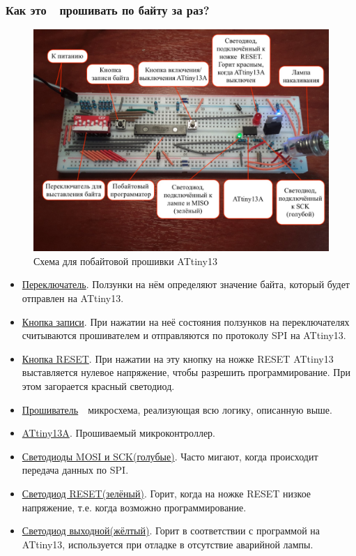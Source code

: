 \documentclass[aspectratio=169, pdf, 8pt, unicode]{beamer}
\begin{document}
\begin{frame}[fragile]
\frametitle{Как это\ \cyrdash\ прошивать по байту за раз?}
	\begin{minipage}{0.54\textwidth}
		\begin{figure}[H]
			\centering
			\includegraphics[width=\textwidth]{resources/schematic_new_rus.jpg}
			\caption{Схема для побайтовой прошивки ATtiny13}
		\end{figure}
	\end{minipage}
	\begin{minipage}{0.45\textwidth}
		\vspace*{-0.1cm}
		\begin{itemize}
		\small
			\item \underline{Переключатель}. Ползунки на нём определяют значение байта, который будет отправлен на ATtiny13.
			\item \underline{Кнопка записи}. При нажатии на неё состояния ползунков на переключателях считываются прошивателем
				и отправляются по протоколу SPI на ATtiny13.
			\item \underline{Кнопка RESET}. При нажатии на эту кнопку на ножке RESET ATtiny13 выставляется нулевое
				напряжение, чтобы разрешить программирование. При этом загорается красный светодиод.
			\item \underline{Прошиватель}\ \cyrdash\ микросхема, реализующая всю логику, описанную выше.
			\item \underline{ATtiny13A}. Прошиваемый микроконтроллер.
			\item \underline{Светодиоды MOSI и SCK(голубые)}. Часто мигают, когда происходит передача данных по SPI.
			\item \underline{Светодиод RESET(зелёный)}. Горит, когда на ножке RESET низкое напряжение, т.е. когда возможно
				программирование.
			\item \underline{Светодиод выходной(жёлтый)}. Горит в соответствии с программой на ATtiny13, используется
				при отладке в отсутствие аварийной лампы.
		\end{itemize}
	\end{minipage}
\end{frame}
\end{document}
